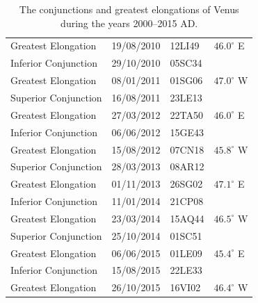 \begin{table}[!h]
{\begin{tabular}{lcll}
Greatest Elongation & 19/08/2010 & 12LI49 & $46.0^\circ$ E\\
Inferior Conjunction & 29/10/2010 & 05SC34&\\
Greatest Elongation & 08/01/2011 & 01SG06 & $47.0^\circ$ W\\
Superior Conjunction & 16/08/2011 & 23LE13&\\
Greatest Elongation & 27/03/2012 & 22TA50 & $46.0^\circ$ E\\
Inferior Conjunction & 06/06/2012 & 15GE43&\\
Greatest Elongation & 15/08/2012 & 07CN18 & $45.8^\circ$ W\\
Superior Conjunction & 28/03/2013 & 08AR12&\\
Greatest Elongation & 01/11/2013 & 26SG02 & $47.1^\circ$ E\\
Inferior Conjunction & 11/01/2014 & 21CP08&\\
Greatest Elongation & 23/03/2014 & 15AQ44 & $46.5^\circ$ W\\
Superior Conjunction & 25/10/2014 & 01SC51&\\
Greatest Elongation & 06/06/2015 & 01LE09 & $45.4^\circ$ E\\
Inferior Conjunction & 15/08/2015 & 22LE33&\\
Greatest Elongation & 26/10/2015 & 16VI02 & $46.4^\circ$ W\\
\end{tabular}}
\caption{The conjunctions and greatest elongations of Venus
during the years 2000--2015 AD.}\label{vtvenus}
\end{table}

